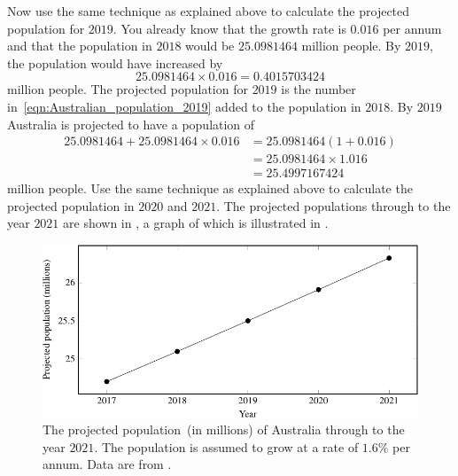 \documentclass[a4paper,oneside,12pt]{article}
\begin{document}
\begin{solution}
Now use the same technique as explained above to calculate the
projected population for $2019$.  You already know that the growth
rate is $0.016$ per annum and that the population in $2018$ would be
$25.0981464$ million people.  By $2019$, the population would have
increased by
\begin{equation}
\label{eqn:Australian_population_2019}
25.0981464 \times 0.016
=
0.4015703424
\end{equation}
million people.  The projected population for $2019$ is the number
in~\eqref{eqn:Australian_population_2019} added to the population in
$2018$.  By $2019$ Australia is projected to have a population of
\begin{align*}
25.0981464 + 25.0981464 \times 0.016
&=
25.0981464 (1 + 0.016) \\[4pt]
&=
25.0981464 \times 1.016 \\[4pt]
&=
25.4997167424
\end{align*}
million people.  Use the same technique as explained above to
calculate the projected population in $2020$ and $2021$.  The
projected populations through to the year $2021$ are shown in
, a graph of which is
illustrated in .
\end{solution}

\begin{table}[!htbp]
\centering

\caption{%
  The projected population of Australia through to the year $2021$.
  The population numbers are in terms of millions.  For example, the
  population in $2017$ was estimated to be $24.7029$ million people.
  The population is assumed to grow at a rate of $1.6\%$ per annum.
}
\label{tab:Australian_population_2017}
\end{table}

\begin{figure}[!htbp]
\centering
\includegraphics[scale=1]{image/11/australian-population.pdf}
\caption{%
  The projected population~(in millions) of Australia through to the
  year $2021$.  The population is assumed to grow at a rate of $1.6\%$
  per annum.  Data are from .
}
\label{fig:Australian_population_2017}
\end{figure}
\end{document}
